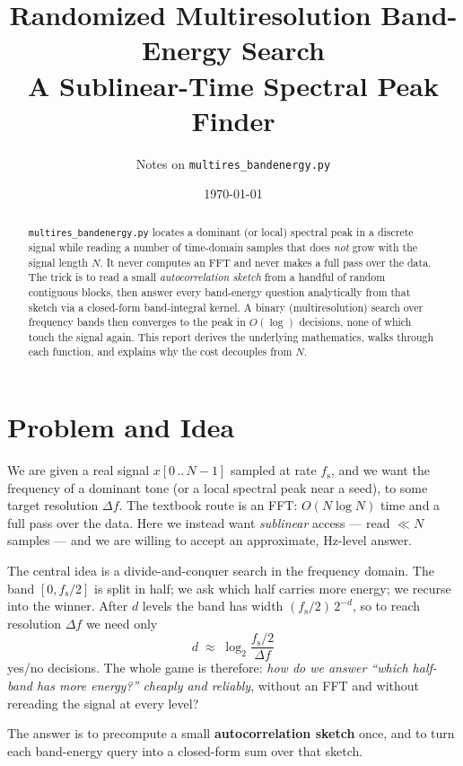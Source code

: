 \documentclass[11pt]{article}
\title{Randomized Multiresolution Band-Energy Search\\
       \large A Sublinear-Time Spectral Peak Finder}
\author{Notes on \texttt{multires\_bandenergy.py}}
\date{\today}
\newcommand{\fs}{f_{\mathrm{s}}}
\begin{document}
\maketitle

\begin{abstract}
\texttt{multires\_bandenergy.py} locates a dominant (or local) spectral peak in a
discrete signal while reading a number of time-domain samples that does
\emph{not} grow with the signal length $N$. It never computes an FFT and never
makes a full pass over the data. The trick is to read a small
\emph{autocorrelation sketch} from a handful of random contiguous blocks, then
answer every band-energy question analytically from that sketch via a closed-form
band-integral kernel. A binary (multiresolution) search over frequency bands
then converges to the peak in $O(\log)$ decisions, none of which touch the
signal again. This report derives the underlying mathematics, walks through each
function, and explains why the cost decouples from $N$.
\end{abstract}

\tableofcontents

\section{Problem and Idea}

We are given a real signal $x[0\,..\,N-1]$ sampled at rate $\fs$, and we want the
frequency of a dominant tone (or a local spectral peak near a seed), to some
target resolution $\Delta f$. The textbook route is an FFT: $O(N\log N)$ time and
a full pass over the data. Here we instead want \emph{sublinear} access --- read
$\ll N$ samples --- and we are willing to accept an approximate, Hz-level answer.

The central idea is a divide-and-conquer search in the frequency domain. The
band $[0,\fs/2]$ is split in half; we ask which half carries more energy; we
recurse into the winner. After $d$ levels the band has width $(\fs/2)\,2^{-d}$, so
to reach resolution $\Delta f$ we need only
\begin{equation}
  d \;\approx\; \log_2\!\frac{\fs/2}{\Delta f}
  \label{eq:depth}
\end{equation}
yes/no decisions. The whole game is therefore: \emph{how do we answer
``which half-band has more energy?'' cheaply and reliably}, without an FFT and
without rereading the signal at every level?

The answer is to precompute a small \textbf{autocorrelation sketch} once, and to
turn each band-energy query into a closed-form sum over that sketch.
\end{document}
